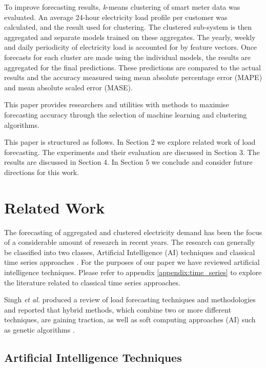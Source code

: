 To improve forecasting results, \textit{k}-means clustering of smart meter data was evaluated. An average 24-hour electricity load profile per customer was calculated, and the result used for clustering. The clustered sub-system is then aggregated and separate models trained on these aggregates. The yearly, weekly and daily periodicity of electricity load is accounted for by feature vectors. Once forecasts for each cluster are made using the individual models, the results are aggregated for the final predictions. These predictions are compared to the actual results and the accuracy measured using mean absolute percentage error (MAPE) and mean absolute scaled error (MASE).

This paper provides researchers and utilities with methods to maximise forecasting accuracy through the selection of machine learning and clustering algorithms.

This paper is structured as follows. In Section 2 we explore related work of load forecasting. The experiments and their evaluation are discussed in Section 3. The results are discussed in Section 4. In Section 5 we conclude and consider future directions for this work.

\section{Related Work}

The forecasting of aggregated and clustered electricity demand has been the focus of a considerable amount of research in recent years. The research can generally be classified into two classes, Artificial Intelligence (AI) techniques \cite{Kim2000, Tiong2008,Quilumba2014} and classical time series approaches \cite{Nazarko2005ARIMAApproach,Huang2003,Nguyen2017}. For the purposes of our paper we have reviewed artificial intelligence techniques. Please refer to appendix \ref{appendix:time_series} to explore the literature related to classical time series approaches.

Singh \textit{et al.} produced a review of load forecasting techniques and methodologies and reported that hybrid methods, which combine two or more different techniques, are gaining traction, as well as soft computing approaches (AI) such as genetic algorithms \cite{Singh2012}.

\subsection{Artificial Intelligence Techniques}

